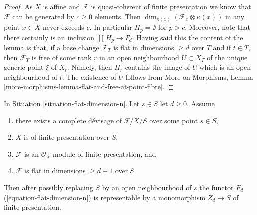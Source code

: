 \begin{proof}
As $X$ is affine and $\mathcal{F}$ is quasi-coherent of finite presentation
we know that $\mathcal{F}$ can be generated by $c \geq 0$ elements.
Then $\dim_{\kappa(x)}(\mathcal{F}_x \otimes \kappa(x))$
in any point $x \in X$ never exceeds $c$. In particular $H_p = \emptyset$
for $p > c$. Moreover, note that there certainly is an inclusion
$\coprod H_p \to F_d$. Having said this the content
of the lemma is that, if a base change $\mathcal{F}_T$ is flat in
dimensions $\geq d$ over $T$ and if $t \in T$, then $\mathcal{F}_T$ is
free of some rank $r$ in an open neighbourhood $U \subset X_T$
of the unique generic point $\xi$ of $X_t$. Namely, then $H_r$
contains the image of $U$ which is an open neighbourhood of $t$.
The existence of $U$ follows from
More on Morphisms, Lemma
\ref{more-morphisms-lemma-flat-and-free-at-point-fibre}.
\end{proof}

\begin{lemma}
\label{lemma-flat-dimension-n-representable}
In Situation \ref{situation-flat-dimension-n}.
Let $s \in S$ let $d \geq 0$. Assume
\begin{enumerate}
\item there exists a complete d\'evisage
of $\mathcal{F}/X/S$ over some point $s \in S$,
\item $X$ is of finite presentation over $S$,
\item $\mathcal{F}$ is an $\mathcal{O}_X$-module of finite presentation, and
\item $\mathcal{F}$ is flat in dimensions $\geq d + 1$ over $S$.
\end{enumerate}
Then after possibly replacing $S$ by an open neighbourhood
of $s$ the functor $F_d$ (\ref{equation-flat-dimension-n})
is representable by a monomorphism $Z_d \to S$ of finite presentation.
\end{lemma}

